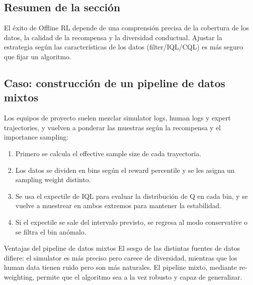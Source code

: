 \subsection{Resumen de la sección}

El éxito de Offline RL depende de una comprensión precisa de la cobertura de los datos, la calidad de la recompensa y la diversidad conductual. Ajustar la estrategia según las características de los datos (filter/IQL/CQL) es más seguro que fijar un algoritmo.

\subsection{Caso: construcción de un pipeline de datos mixtos}

Los equipos de proyecto suelen mezclar simulator logs, human logs y expert trajectories, y vuelven a ponderar las muestras según la recompensa y el importance sampling:

\begin{enumerate}
    \item Primero se calcula el effective sample size de cada trayectoria.
    \item Los datos se dividen en bins según el reward percentile y se les asigna un sampling weight distinto.
    \item Se usa el expectile de IQL para evaluar la distribución de Q en cada bin, y se vuelve a muestrear en ambos extremos para mantener la estabilidad.
    \item Si el expectile se sale del intervalo previsto, se regresa al modo conservative o se filtra el bin anómalo.
\end{enumerate}

\begin{knowledgebox}{Ventajas del pipeline de datos mixtos}
El sesgo de las distintas fuentes de datos difiere: el simulator es más preciso pero carece de diversidad, mientras que los human data tienen ruido pero son más naturales. El pipeline mixto, mediante re-weighting, permite que el algoritmo sea a la vez robusto y capaz de generalizar.
\end{knowledgebox}
